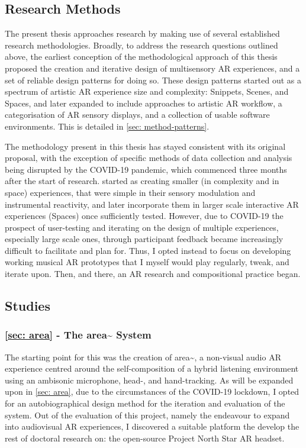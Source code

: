 \subsection{Research Methods}\label{sec: method-outline-methods}
The present thesis approaches research by making use of several established research methodologies. Broadly, to address the research questions outlined above, the earliest conception of the methodological approach of this thesis proposed the creation and iterative design of multisensory AR experiences, and a set of reliable design patterns for doing so. These design patterns started out as a spectrum of artistic AR experience size and complexity: Snippets, Scenes, and Spaces, and later expanded to include approaches to artistic AR workflow, a categorisation of AR sensory displays, and a collection of usable software environments. This is detailed in \autoref{sec: method-patterns}. 

The methodology present in this thesis has stayed consistent with its original proposal, with the exception of specific methods of data collection and analysis being disrupted by the COVID-19 pandemic, which commenced three months after the start of research. started as creating smaller (in complexity and in space) experiences, that were simple in their sensory modulation and instrumental reactivity, and later incorporate them in larger scale interactive AR experiences (Spaces) once sufficiently tested. However, due to COVID-19 the prospect of user-testing and iterating on the design of multiple experiences, especially large scale ones, through participant feedback became increasingly difficult to facilitate and plan for. Thus, I opted instead to focus on developing working musical AR prototypes that I myself would play regularly, tweak, and iterate upon. Then, and there, an AR research and compositional practice began.

\subsection{Studies}
\subsubsection{\autoref{sec: area} -  The area\textasciitilde{} System}
The starting point for this was the creation of area\textasciitilde{}, a non-visual audio AR experience centred around the self-composition of a hybrid listening environment using an ambisonic microphone, head-, and hand-tracking. As will be expanded upon in \autoref{sec: area}, due to the circumstances of the COVID-19 lockdown, I opted for an autobiographical design method for the iteration and evaluation of the system. Out of the evaluation of this project, namely the endeavour to expand into audiovisual AR experiences, I discovered a suitable platform the develop the rest of doctoral research on: the open-source Project North Star AR headset.

